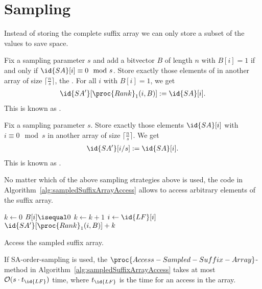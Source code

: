 \section{Sampling}

Instead of storing the complete suffix array we can only store a subset of the values to save space.

\begin{Definition}
  Fix a sampling parameter $s$ and add a bitvector $B$ of length $n$ with $B[i] = 1$ if and only if $\id{SA}[i] \equiv 0 \mod s$. Store exactly those elements of  in another array  of size $\lceil \frac{n}{s} \rceil$, the . For all $i$ with $B[i] = 1$, we get
  \begin{align}
    \id{SA'}[\proc{Rank}_1(i, B)] := \id{SA}[i]
    \text{.}
  \end{align}
  This is known as .
\end{Definition}

\begin{Definition}
  Fix a sampling parameter $s$. Store exactly those elements $\id{SA}[i]$ with $i \equiv 0 \mod s$ in another array  of size $\lceil \frac{n}{s} \rceil$. We get
  \begin{align}
    \id{SA'}[i/s] := \id{SA}[i]
    \text{.}
  \end{align}
  This is known as .
\end{Definition}

No matter which of the above sampling strategies above is used, the code in Algorithm~\ref{alg:sampledSuffixArrayAccess} allows to access arbitrary elements of the suffix array.

\begin{algorithm}[htb]
  \begin{codebox}
    \li $k \gets 0$
    \li \While $B[i] \isequal 0$
        \Do
    \li   $k \gets k + 1$
    \li   $i \gets \id{LF}[i]$    
        \End
    \li \Return $\id{SA'}[\proc{Rank}_1(i, B)] + k$
  \end{codebox}
  \caption{Access the sampled suffix array.}
  \label{alg:sampledSuffixArrayAccess}
\end{algorithm}

\begin{Theorem}
  \label{thm:sampledSuffixArrayAccess}
  If SA-order-sampling is used, the $\proc{Access-Sampled-Suffix-Array}$-method in Algorithm~\ref{alg:sampledSuffixArrayAccess} takes at most $\mathcal{O}(s\cdot t_{\id{LF}})$ time, where $t_{\id{LF}}$ is the time for an access in the  array.
\end{Theorem}

